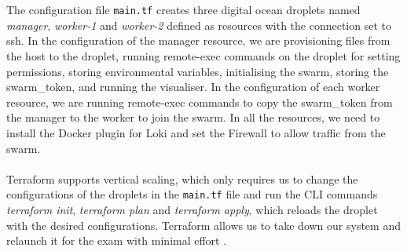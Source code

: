 \\
\\
The configuration file \texttt{main.tf} creates three digital ocean droplets named \textit{manager}, \textit{worker-1} and \textit{worker-2} defined as resources with the connection set to ssh. In the configuration of the manager resource, we are provisioning files from the host to the droplet, running remote-exec commands on the droplet for setting permissions, storing environmental variables, initialising the swarm, storing the swarm\_token, and running the visualiser. In the configuration of each worker resource, we are running remote-exec commands to copy the swarm\_token from the manager to the worker to join the swarm. In all the resources, we need to install the Docker plugin for Loki and set the Firewall to allow traffic from the swarm. 
\\
\\
Terraform supports vertical scaling, which only requires us to change the configurations of the droplets in the \texttt{main.tf} file and run the CLI commands \textit{terraform init}, \textit{terraform plan} and \textit{terraform apply}, which reloads the droplet with the desired configurations. Terraform allows us to take down our system and relaunch it for the exam with minimal effort \cite{terraform}. 



